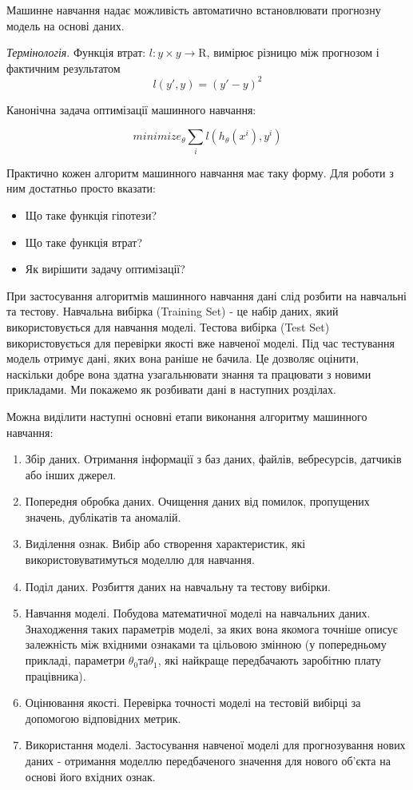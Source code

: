 Машинне навчання надає можливість автоматично встановлювати прогнозну модель на основі даних.

\textit{Термінологія}. Функція втрат: $l: y \times y \rightarrow \mathrm{R}$, вимірює різницю між прогнозом і 
фактичним результатом $$l(y',y)=(y'-y)^{2}$$

Канонічна задача оптимізації машинного навчання:

$$minimize_{\theta}\sum_{i}l(h_{\theta}(x^{i}), y^{i})$$

Практично кожен алгоритм машинного навчання має таку форму. Для роботи з ним достатньо просто вказати:

\begin{itemize}
\item Що таке функція гіпотези?
\item Що таке функція втрат?
\item Як вирішити задачу оптимізації?
\end{itemize}

При застосування алгоритмів машинного навчання дані слід розбити на навчальні та тестову. Навчальна вибірка (Training Set) - це набір даних, який використовується для навчання моделі. Тестова вибірка (Test Set) використовується для перевірки якості вже навченої моделі. Під час тестування модель отримує дані, яких вона раніше не бачила. Це дозволяє оцінити, наскільки добре вона здатна узагальнювати знання та працювати з новими прикладами. Ми покажемо як розбивати дані в наступних розділах.

Можна виділити наступні основні етапи виконання алгоритму машинного навчання:

\begin{enumerate}
\item Збір даних. Отримання інформації з баз даних, файлів, вебресурсів, датчиків або інших джерел.
\item Попередня обробка даних. Очищення даних від помилок, пропущених значень, дублікатів та аномалій.
\item Виділення ознак. Вибір або створення характеристик, які використовуватимуться моделлю для навчання.
\item Поділ даних. Розбиття даних на навчальну та тестову вибірки.
\item Навчання моделі. Побудова математичної моделі на навчальних даних. Знаходження таких параметрів моделі, за яких вона якомога точніше описує залежність між вхідними ознаками та цільовою змінною (у попередньому прикладі, параметри $\theta_{0} та \theta_{1}$, які найкраще передбачають заробітню плату працівника).
\item Оцінювання якості. Перевірка точності моделі на тестовій вибірці за допомогою відповідних метрик.
\item Використання моделі. Застосування навченої моделі для прогнозування нових даних - отримання моделлю передбаченого значення для нового об'єкта на основі його вхідних ознак.
\end{enumerate}


